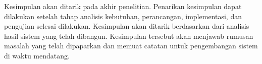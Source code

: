 Kesimpulan akan ditarik pada akhir penelitian. Penarikan kesimpulan dapat
dilakukan setelah tahap analisis kebutuhan, perancangan, implementasi, dan
pengujian selesai dilakukan. Kesimpulan akan ditarik berdasarkan dari analisis
hasil sistem yang telah dibangun. Kesimpulan tersebut akan menjawab rumusan
masalah yang telah dipaparkan dan memuat catatan untuk pengembangan sistem di
waktu mendatang.


